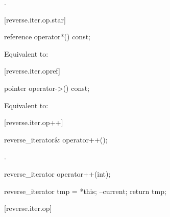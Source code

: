 \begin{itemdescr}
\pnum
\returns
{}.
\end{itemdescr}

[reverse.iter.op.star]{}

%
\begin{itemdecl}
reference operator*() const;
\end{itemdecl}

\begin{itemdescr}
\pnum
\effects Equivalent to: 
\end{itemdescr}

[reverse.iter.opref]{}

%
\begin{itemdecl}
pointer operator->() const;
\end{itemdecl}

\begin{itemdescr}
\pnum
\effects Equivalent to: 
\end{itemdescr}

[reverse.iter.op++]{}

%
\begin{itemdecl}
reverse_iterator& operator++();
\end{itemdecl}

\begin{itemdescr}
\pnum
\effects
{}

\pnum
\returns
{}.
\end{itemdescr}

%
%
\begin{itemdecl}
reverse_iterator operator++(int);
\end{itemdecl}

\begin{itemdescr}
\pnum
\effects
\begin{codeblock}
reverse_iterator tmp = *this;
--current;
return tmp;
\end{codeblock}
\end{itemdescr}

[reverse.iter.op\dcr]{}

